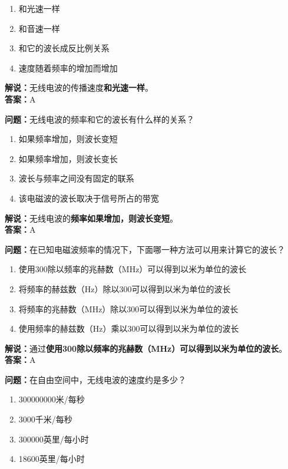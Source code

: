 \begin{enumerate}[label=\Alph*), leftmargin=1cm]
	\item 和光速一样
	\item 和音速一样
	\item 和它的波长成反比例关系
	\item 速度随着频率的增加而增加
\end{enumerate}

\textbf{解说：}无线电波的传播速度\textbf{和光速一样}。\\\textbf{答案：}A



\textbf{问题：}无线电波的频率和它的波长有什么样的关系？

\begin{enumerate}[label=\Alph*), leftmargin=1cm]
	\item 如果频率增加，则波长变短
	\item 如果频率增加，则波长变长
	\item 波长与频率之间没有固定的联系
	\item 该电磁波的波长取决于信号所占的带宽
\end{enumerate}

\textbf{解说：}无线电波的\textbf{频率如果增加，则波长变短}。\\\textbf{答案：}A



\textbf{问题：}在已知电磁波频率的情况下，下面哪一种方法可以用来计算它的波长？

\begin{enumerate}[label=\Alph*), leftmargin=1cm]
	\item 使用300除以频率的兆赫数（MHz）可以得到以米为单位的波长
	\item 将频率的赫兹数（Hz）除以300可以得到以米为单位的波长
	\item 将频率的兆赫数（MHz）除以300可以得到以米为单位的波长
	\item 使用频率的赫兹数（Hz）乘以300可以得到以米为单位的波长
\end{enumerate}

\textbf{解说：}通过\textbf{使用300除以频率的兆赫数（MHz）可以得到以米为单位的波长}。\\\textbf{答案：}A



\textbf{问题：}在自由空间中，无线电波的速度约是多少？

\begin{enumerate}[label=\Alph*), leftmargin=1cm]
	\item 300000000米/每秒
	\item 3000千米/每秒
	\item 300000英里/每小时
	\item 18600英里/每小时
\end{enumerate}

